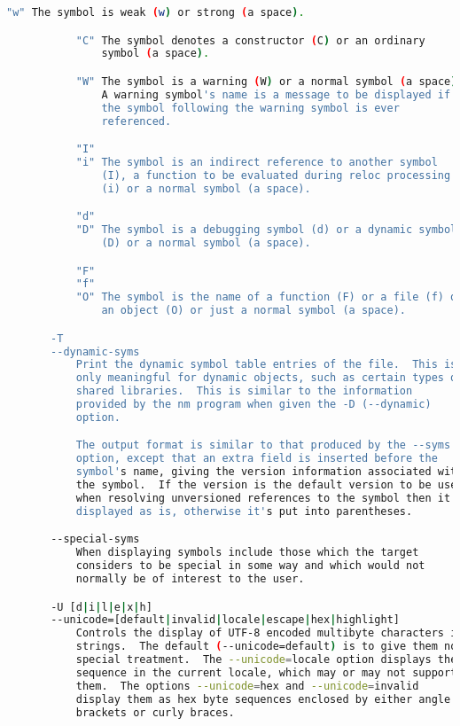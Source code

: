 {{\begin{lstlisting}[language=bash]
           "w" The symbol is weak (w) or strong (a space).

           "C" The symbol denotes a constructor (C) or an ordinary
               symbol (a space).

           "W" The symbol is a warning (W) or a normal symbol (a space).
               A warning symbol's name is a message to be displayed if
               the symbol following the warning symbol is ever
               referenced.

           "I"
           "i" The symbol is an indirect reference to another symbol
               (I), a function to be evaluated during reloc processing
               (i) or a normal symbol (a space).

           "d"
           "D" The symbol is a debugging symbol (d) or a dynamic symbol
               (D) or a normal symbol (a space).

           "F"
           "f"
           "O" The symbol is the name of a function (F) or a file (f) or
               an object (O) or just a normal symbol (a space).

       -T
       --dynamic-syms
           Print the dynamic symbol table entries of the file.  This is
           only meaningful for dynamic objects, such as certain types of
           shared libraries.  This is similar to the information
           provided by the nm program when given the -D (--dynamic)
           option.

           The output format is similar to that produced by the --syms
           option, except that an extra field is inserted before the
           symbol's name, giving the version information associated with
           the symbol.  If the version is the default version to be used
           when resolving unversioned references to the symbol then it's
           displayed as is, otherwise it's put into parentheses.

       --special-syms
           When displaying symbols include those which the target
           considers to be special in some way and which would not
           normally be of interest to the user.

       -U [d|i|l|e|x|h]
       --unicode=[default|invalid|locale|escape|hex|highlight]
           Controls the display of UTF-8 encoded multibyte characters in
           strings.  The default (--unicode=default) is to give them no
           special treatment.  The --unicode=locale option displays the
           sequence in the current locale, which may or may not support
           them.  The options --unicode=hex and --unicode=invalid
           display them as hex byte sequences enclosed by either angle
           brackets or curly braces.


\end{lstlisting}}}
